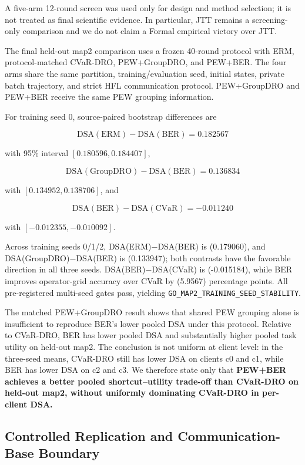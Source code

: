 A five-arm 12-round screen was used only for design and method selection; it is not treated as final scientific evidence. In particular, JTT remains a screening-only comparison and we do not claim a Formal empirical victory over JTT.

The final held-out map2 comparison uses a frozen 40-round protocol with ERM, protocol-matched CVaR-DRO, PEW+GroupDRO, and PEW+BER. The four arms share the same partition, training/evaluation seed, initial states, private batch trajectory, and strict HFL communication protocol. PEW+GroupDRO and PEW+BER receive the same PEW grouping information.



For training seed 0, source-paired bootstrap differences are

\[
\mathrm{DSA(ERM)}-\mathrm{DSA(BER)}=0.182567
\]

with 95\% interval \([0.180596,0.184407]\),

\[
\mathrm{DSA(GroupDRO)}-\mathrm{DSA(BER)}=0.136834
\]

with \([0.134952,0.138706]\), and

\[
\mathrm{DSA(BER)}-\mathrm{DSA(CVaR)}=-0.011240
\]

with \([-0.012355,-0.010092]\).

Across training seeds 0/1/2, DSA(ERM)$-$DSA(BER) is (0.179060), and DSA(GroupDRO)$-$DSA(BER) is (0.133947); both contrasts have the favorable direction in all three seeds. DSA(BER)$-$DSA(CVaR) is (-0.015184), while BER improves operator-grid accuracy over CVaR by (5.9567) percentage points. All pre-registered multi-seed gates pass, yielding \texttt{GO\_MAP2\_TRAINING\_SEED\_STABILITY}.

The matched PEW+GroupDRO result shows that shared PEW grouping alone is insufficient to reproduce BER's lower pooled DSA under this protocol. Relative to CVaR-DRO, BER has lower pooled DSA and substantially higher pooled task utility on held-out map2. The conclusion is not uniform at client level: in the three-seed means, CVaR-DRO still has lower DSA on clients c0 and c1, while BER has lower DSA on c2 and c3. We therefore state only that \textbf{PEW+BER achieves a better pooled shortcut--utility trade-off than CVaR-DRO on held-out map2, without uniformly dominating CVaR-DRO in per-client DSA.}

\subsection{Controlled Replication and Communication-Base Boundary}


